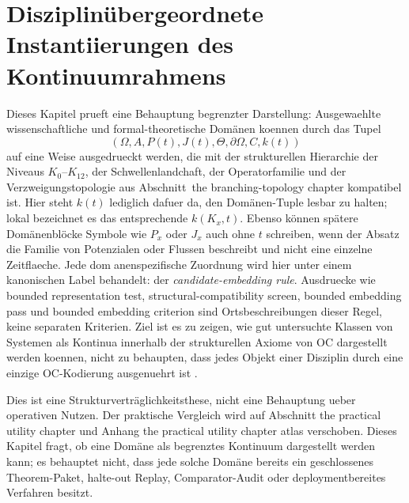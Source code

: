 
\section{Disziplinübergeordnete Instantiierungen des Kontinuumrahmens}
\label{sec:disciplines-extended}

Dieses Kapitel prueft eine Behauptung begrenzter Darstellung: Ausgewaehlte
wissenschaftliche und formal-theoretische Domänen koennen durch das Tupel
\[
  (\Omega, A, P(t), J(t), \Theta, \partial\Omega, C, k(t))
\]
auf eine Weise ausgedrueckt werden, die mit der strukturellen Hierarchie der
Niveaus \(K_0\)--\(K_{12}\), der Schwellenlandchaft, der Operatorfamilie und der
Verzweigungstopologie aus Abschnitt~the branching-topology chapter kompatibel ist.
Hier steht \(k(t)\) lediglich dafuer da, den Domänen-Tuple lesbar zu halten;
lokal bezeichnet es das entsprechende \(k(K_x,t)\).
Ebenso können spätere Domänenblöcke Symbole wie \(P_x\) oder \(J_x\)
auch ohne \(t\) schreiben, wenn der Absatz die Familie von Potenzialen oder
Flussen beschreibt und nicht eine einzelne Zeitflaeche.
Jede domanenspezifische Zuordnung wird hier unter einem kanonischen Label behandelt:
der \emph{candidate-embedding rule}. Ausdruecke wie bounded
representation test, structural-compatibility screen, bounded embedding pass und
bounded embedding criterion sind Ortsbeschreibungen dieser Regel, keine
separaten Kriterien. Ziel ist es zu zeigen, wie gut untersuchte Klassen von
Systemen als Kontinua innerhalb der strukturellen Axiome von OC dargestellt werden
koennen, nicht zu behaupten, dass jedes Objekt einer Disziplin durch eine
einzige OC-Kodierung ausgenuehrt ist
\parencite{anderson_more_is_different}.

Dies ist eine Strukturverträglichkeitsthese, nicht eine Behauptung ueber
operativen Nutzen. Der praktische Vergleich wird auf Abschnitt
the practical utility chapter und Anhang
the practical utility chapter atlas verschoben. Dieses Kapitel fragt,
ob eine Domäne als begrenztes Kontinuum dargestellt werden kann; es behauptet
nicht, dass jede solche Domäne bereits ein geschlossenes Theorem-Paket,
halte-out Replay, Comparator-Audit oder deploymentbereites Verfahren besitzt.

